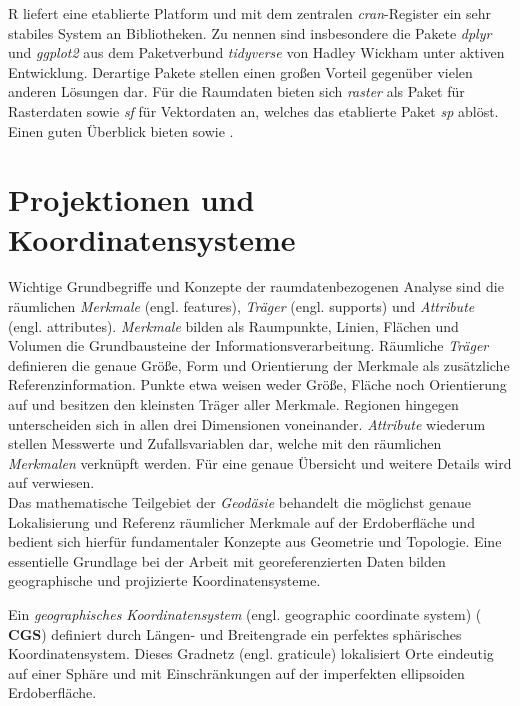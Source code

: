 R liefert eine etablierte Platform und mit dem zentralen \emph{cran}-Register ein sehr stabiles System an Bibliotheken.
Zu nennen sind insbesondere die Pakete \emph{dplyr} und \emph{ggplot2} aus dem Paketverbund \emph{tidyverse} von Hadley Wickham unter aktiven Entwicklung.
Derartige Pakete stellen einen großen Vorteil gegenüber vielen anderen Lösungen dar. Für die Raumdaten bieten sich \emph{raster} als Paket für Rasterdaten sowie \emph{sf} für Vektordaten an,
welches das etablierte Paket \emph{sp} ablöst. 
Einen guten Überblick bieten \cite[S. 53]{fischer_handbook_2010} sowie \cite{bivand_applied_2013}. 

\section{Projektionen und Koordinatensysteme}
\label{ch:projections}

Wichtige Grundbegriffe und Konzepte der raumdatenbezogenen Analyse sind die
räumlichen \emph{Merkmale} (engl. features), \emph{Träger} (engl. supports) 
und \emph{Attribute} (engl. attributes). \emph{Merkmale} bilden als Raumpunkte, Linien, Flächen und Volumen die Grundbausteine der Informationsverarbeitung. 
Räumliche \emph{Träger} definieren die genaue Größe, Form und Orientierung der Merkmale als zusätzliche Referenzinformation. 
Punkte etwa weisen weder Größe, Fläche noch Orientierung auf und besitzen den kleinsten Träger aller Merkmale. 
Regionen hingegen unterscheiden sich in allen drei Dimensionen voneinander.
\emph{Attribute} wiederum stellen Messwerte und Zufallsvariablen dar, welche mit den räumlichen \emph{Merkmalen} verknüpft werden.
Für eine genaue Übersicht und weitere Details wird auf \cite[S.38]{waller_applied_2004} verwiesen.\\

Das mathematische Teilgebiet der \emph{Geodäsie} behandelt die möglichst genaue Lokalisierung und Referenz
räumlicher Merkmale auf der Erdoberfläche und bedient sich hierfür fundamentaler Konzepte aus Geometrie und Topologie. 
Eine essentielle Grundlage bei der Arbeit mit georeferenzierten Daten bilden geographische und projizierte Koordinatensysteme.  

Ein \emph{geographisches Koordinatensystem} (engl. geographic coordinate system) ($\mathbf{CGS}$) 
definiert durch Längen- und Breitengrade ein perfektes sphärisches Koordinatensystem. 
Dieses Gradnetz (engl. graticule) lokalisiert Orte eindeutig auf einer Sphäre 
und mit Einschränkungen auf der imperfekten ellipsoiden Erdoberfläche.

